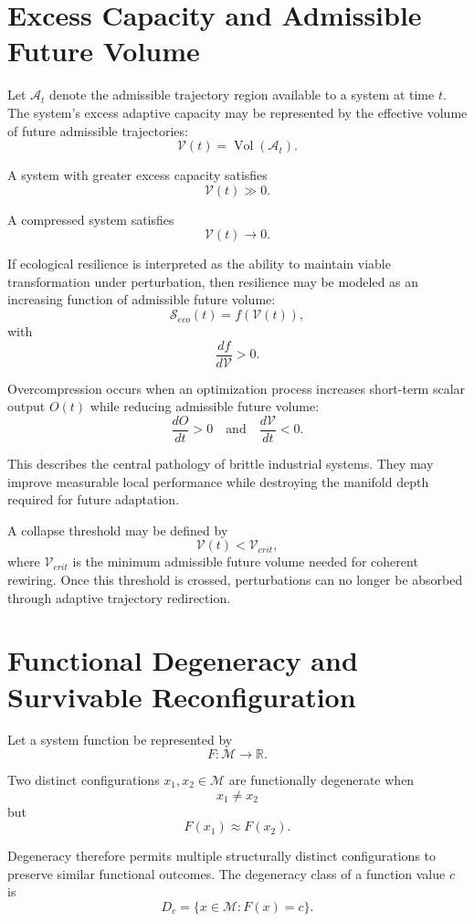 \documentclass[11pt,a4paper]{article}
\newcommand{\Aspace}{\mathcal{A}}
\newcommand{\Mspace}{\mathcal{M}}
\begin{document}
\section{Excess Capacity and Admissible Future Volume}

Let $\Aspace_t$ denote the admissible trajectory region available to a system at time $t$. The system's excess adaptive capacity may be represented by the effective volume of future admissible trajectories:
\[
\mathcal{V}(t)=\operatorname{Vol}(\Aspace_t).
\]

A system with greater excess capacity satisfies
\[
\mathcal{V}(t) \gg 0.
\]

A compressed system satisfies
\[
\mathcal{V}(t)\rightarrow 0.
\]

If ecological resilience is interpreted as the ability to maintain viable transformation under perturbation, then resilience may be modeled as an increasing function of admissible future volume:
\[
\mathcal{S}_{eco}(t)=f(\mathcal{V}(t)),
\]
with
\[
\frac{df}{d\mathcal{V}}>0.
\]

Overcompression occurs when an optimization process increases short-term scalar output $O(t)$ while reducing admissible future volume:
\[
\frac{dO}{dt}>0
\quad \text{and} \quad
\frac{d\mathcal{V}}{dt}<0.
\]

This describes the central pathology of brittle industrial systems. They may improve measurable local performance while destroying the manifold depth required for future adaptation.

A collapse threshold may be defined by
\[
\mathcal{V}(t)<\mathcal{V}_{crit},
\]
where $\mathcal{V}_{crit}$ is the minimum admissible future volume needed for coherent rewiring. Once this threshold is crossed, perturbations can no longer be absorbed through adaptive trajectory redirection.

\section{Functional Degeneracy and Survivable Reconfiguration}

Let a system function be represented by
\[
F:\Mspace\rightarrow \mathbb{R}.
\]

Two distinct configurations $x_1,x_2\in\Mspace$ are functionally degenerate when
\[
x_1\neq x_2
\]
but
\[
F(x_1)\approx F(x_2).
\]

Degeneracy therefore permits multiple structurally distinct configurations to preserve similar functional outcomes. The degeneracy class of a function value $c$ is
\[
D_c=\{x\in\Mspace : F(x)=c\}.
\]
\end{document}
